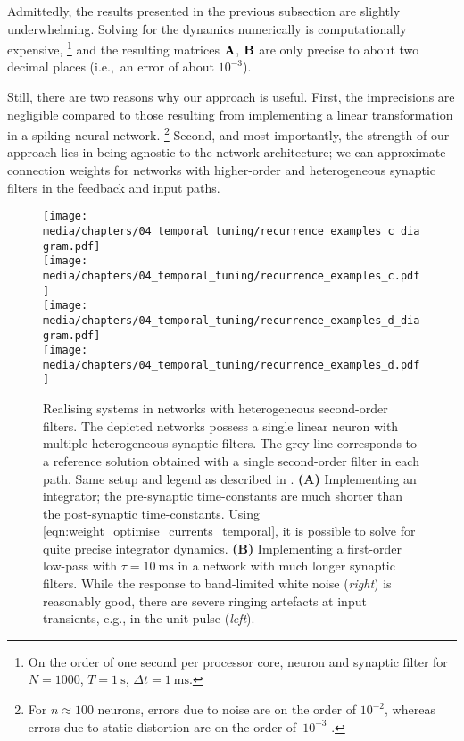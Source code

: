 Admittedly, the results presented in the previous subsection are slightly underwhelming.
Solving for the dynamics numerically is computationally expensive,%
\footnote{On the order of one second per processor core, neuron and synaptic filter for $N = {1000}$, $T = \SI{1}{\second}$, $\Delta t = \SI{1}{\milli\second}$.}
and the resulting matrices $\mathbf{A}$, $\mathbf{B}$ are only precise to about two decimal places (i.e.,~an error of about $10^{-3}$).

Still, there are two reasons why our approach is useful.
First, the imprecisions are negligible compared to those resulting from implementing a linear transformation in a spiking neural network.%
\footnote{For $n \approx 100$ neurons, errors due to noise are on the order of $10^{-2}$, whereas errors due to static distortion are on the order of~$10^{-3}$ \citep[cf.][Section~2.2.2 and Figure~2.6, note the squared errors]{eliasmith2003neural}.}
Second, and most importantly, the strength of our approach lies in being agnostic to the network architecture; we can approximate connection weights for networks with higher-order and heterogeneous synaptic filters in the feedback and input paths.

\begin{figure}[p]
	\centering
	\texttt{[image: media/chapters/04\_temporal\_tuning/recurrence\_examples\_c\_diagram.pdf]}\\[0.5em]
	\texttt{[image: media/chapters/04\_temporal\_tuning/recurrence\_examples\_c.pdf]}\\[1.45em]
	\texttt{[image: media/chapters/04\_temporal\_tuning/recurrence\_examples\_d\_diagram.pdf]}\\[0.5em]
	\texttt{[image: media/chapters/04\_temporal\_tuning/recurrence\_examples\_d.pdf]}
	{\label{fig:recurrence_examples_2a}}%
	{\label{fig:recurrence_examples_2b}}%
	\caption[Realising LTI systems in networks with heterogeneous second-order filters]{Realising \LTI systems in networks with heterogeneous second-order filters.
	The depicted networks possess a single linear neuron with multiple heterogeneous synaptic filters.
	The grey line corresponds to a reference solution obtained with a single second-order filter in each path.
	Same setup and legend as described in .
	\textbf{(A)} Implementing an integrator; the pre-synaptic time-constants are much shorter than the post-synaptic time-constants.
	Using \cref{eqn:weight_optimise_currents_temporal}, it is possible to solve for quite precise integrator dynamics.
	\textbf{(B)} Implementing a first-order low-pass with $\tau = \SI{10}{\milli\second}$ in a network with much longer synaptic filters.
	While the response to band-limited white noise (\emph{right}) is reasonably good, there are severe ringing artefacts at input transients, e.g., in the unit pulse (\emph{left}).
	}
	\label{fig:recurrence_examples_2}
\end{figure}

